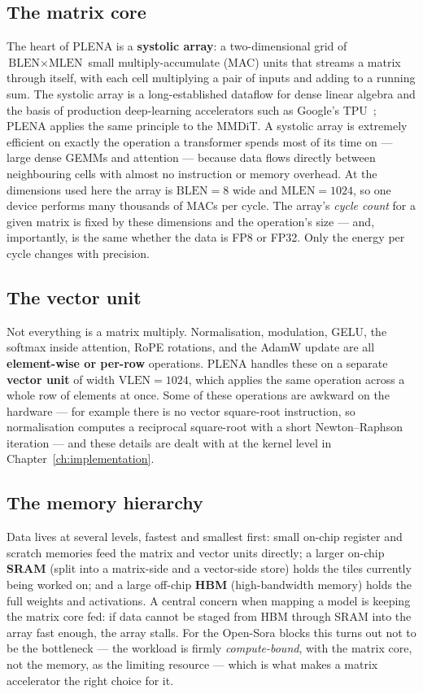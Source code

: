 \documentclass[11pt]{report}
\begin{document}
\subsection{The matrix core}

The heart of PLENA is a \textbf{systolic array}: a two-dimensional grid of
$\text{BLEN} \times \text{MLEN}$ small multiply-accumulate (MAC) units that
streams a matrix through itself, with each cell multiplying a pair of
inputs and adding to a running sum. The systolic array is a long-established
dataflow for dense linear algebra and the basis of production deep-learning
accelerators such as Google's TPU~\cite{jouppi2017tpu}; PLENA applies the same
principle to the MMDiT. A systolic array is extremely
efficient on exactly the operation a transformer spends most of its time
on --- large dense GEMMs and attention --- because data flows directly
between neighbouring cells with almost no instruction or memory overhead.
At the dimensions used here the array is $\text{BLEN}=8$ wide and
$\text{MLEN}=1024$, so one device performs many thousands of MACs per
cycle. The array's \emph{cycle count} for a given matrix is fixed by these
dimensions and the operation's size --- and, importantly, is the same
whether the data is FP8 or FP32. Only the energy per cycle changes with
precision.

\subsection{The vector unit}

Not everything is a matrix multiply. Normalisation, modulation, GELU, the
softmax inside attention, RoPE rotations, and the AdamW update are all
\textbf{element-wise or per-row} operations. PLENA handles these on a
separate \textbf{vector unit} of width $\text{VLEN}=1024$, which applies
the same operation across a whole row of elements at once. Some of these
operations are awkward on the hardware --- for example there is no vector
square-root instruction, so normalisation computes a reciprocal
square-root with a short Newton--Raphson iteration --- and these details
are dealt with at the kernel level in Chapter~\ref{ch:implementation}.

\subsection{The memory hierarchy}

Data lives at several levels, fastest and smallest first: small on-chip
register and scratch memories feed the matrix and vector units directly; a
larger on-chip \textbf{SRAM} (split into a matrix-side and a vector-side
store) holds the tiles currently being worked on; and a large off-chip
\textbf{HBM} (high-bandwidth memory) holds the full weights and
activations. A central concern when mapping a model is keeping the matrix
core fed: if data cannot be staged from HBM through SRAM into the array
fast enough, the array stalls. For the Open-Sora blocks this turns out not
to be the bottleneck --- the workload is firmly \emph{compute-bound}, with
the matrix core, not the memory, as the limiting resource ---
which is what makes a matrix accelerator the right choice for it.
\end{document}
